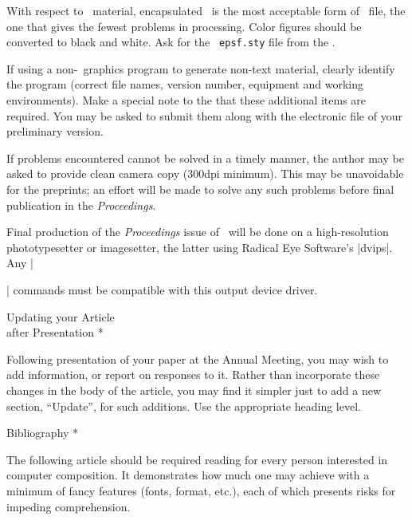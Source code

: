With respect to \PS\ material, encapsulated \PS\ is the most acceptable
form of \PS\ file, the one that gives the fewest problems in processing.
Color figures should be converted to black and white.  Ask for the {\tt
epsf.sty} file from the \editor.

If using a non-\PS\ graphics program to generate non-text material,
clearly identify the program (correct file names, version number,
equipment and working environments).  Make a special note to the \editor{}
that these additional items are required.
You may be asked to submit them along with the electronic
file of your preliminary version.

If problems encountered cannot be solved in a timely manner, the author
may be asked to provide clean camera copy (300dpi minimum).  This may be
unavoidable for the preprints; an effort will be made to solve any such
problems before final publication in the {\sl Proceedings}.

Final production of the {\sl Proceedings\/} issue of \TUB\ will be done
on a high-resolution phototypesetter or \PS{} imagesetter, the latter
using Radical Eye Software's |dvips|.  Any |\special| commands must be
compatible with this output device driver.

\head * Updating your Article\\ after Presentation *

Following presentation of your paper at the Annual Meeting, you may wish
to add information, or report on responses to it.  Rather than
incorporate these changes in the body of the article, you may find it
simpler just to add a new section, ``Update'', for such additions.  Use
the appropriate heading level.

\head * Bibliography *




\medskip

The following article should be required reading for every person
interested in computer composition.  It demonstrates how
much one may achieve with a minimum of fancy features (fonts, format,
etc.), each of which presents risks for impeding comprehension.

